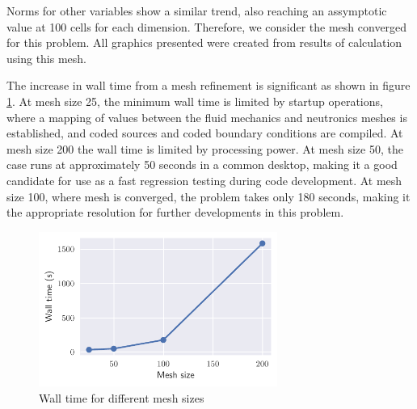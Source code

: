 Norms for other variables show a similar trend, also reaching an assymptotic value at 100 cells for each dimension.
Therefore, we consider the mesh converged for this problem.
All graphics presented were created from results of calculation using this mesh.

The increase in wall time from a mesh refinement is significant as shown in figure \ref{fig:wallTime}.
At mesh size 25, the minimum wall time is limited by startup operations, where a mapping of values between the fluid mechanics and neutronics meshes is established, and coded sources and coded boundary conditions are compiled.
At mesh size 200 the wall time is limited by processing power.
At mesh size 50, the case runs at approximately 50 seconds in a common desktop, making it a good candidate for use as a fast regression testing during code development.
At mesh size 100, where mesh is converged, the problem takes only 180 seconds, making it the appropriate resolution for further developments in this problem.

\begin{figure}[htbp]
    \centering
    \includegraphics[width=78mm]{3_results_and_discussion/figures/wallTime.pdf}
    \caption{Wall time for different mesh sizes}
    \label{fig:wallTime}
\end{figure}
